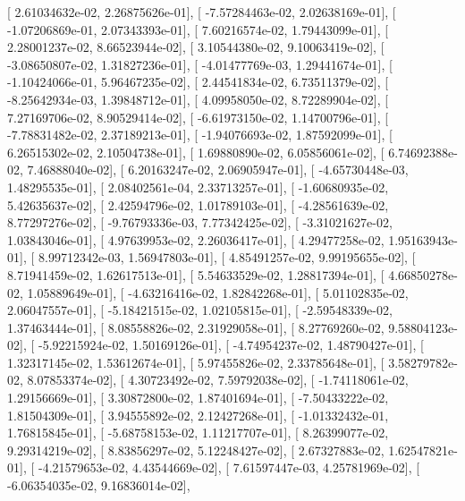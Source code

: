 \documentclass{article}
\begin{document}
       [  2.61034632e-02,   2.26875626e-01],
       [ -7.57284463e-02,   2.02638169e-01],
       [ -1.07206869e-01,   2.07343393e-01],
       [  7.60216574e-02,   1.79443099e-01],
       [  2.28001237e-02,   8.66523944e-02],
       [  3.10544380e-02,   9.10063419e-02],
       [ -3.08650807e-02,   1.31827236e-01],
       [ -4.01477769e-03,   1.29441674e-01],
       [ -1.10424066e-01,   5.96467235e-02],
       [  2.44541834e-02,   6.73511379e-02],
       [ -8.25642934e-03,   1.39848712e-01],
       [  4.09958050e-02,   8.72289904e-02],
       [  7.27169706e-02,   8.90529414e-02],
       [ -6.61973150e-02,   1.14700796e-01],
       [ -7.78831482e-02,   2.37189213e-01],
       [ -1.94076693e-02,   1.87592099e-01],
       [  6.26515302e-02,   2.10504738e-01],
       [  1.69880890e-02,   6.05856061e-02],
       [  6.74692388e-02,   7.46888040e-02],
       [  6.20163247e-02,   2.06905947e-01],
       [ -4.65730448e-03,   1.48295535e-01],
       [  2.08402561e-04,   2.33713257e-01],
       [ -1.60680935e-02,   5.42635637e-02],
       [  2.42594796e-02,   1.01789103e-01],
       [ -4.28561639e-02,   8.77297276e-02],
       [ -9.76793336e-03,   7.77342425e-02],
       [ -3.31021627e-02,   1.03843046e-01],
       [  4.97639953e-02,   2.26036417e-01],
       [  4.29477258e-02,   1.95163943e-01],
       [  8.99712342e-03,   1.56947803e-01],
       [  4.85491257e-02,   9.99195655e-02],
       [  8.71941459e-02,   1.62617513e-01],
       [  5.54633529e-02,   1.28817394e-01],
       [  4.66850278e-02,   1.05889649e-01],
       [ -4.63216416e-02,   1.82842268e-01],
       [  5.01102835e-02,   2.06047557e-01],
       [ -5.18421515e-02,   1.02105815e-01],
       [ -2.59548339e-02,   1.37463444e-01],
       [  8.08558826e-02,   2.31929058e-01],
       [  8.27769260e-02,   9.58804123e-02],
       [ -5.92215924e-02,   1.50169126e-01],
       [ -4.74954237e-02,   1.48790427e-01],
       [  1.32317145e-02,   1.53612674e-01],
       [  5.97455826e-02,   2.33785648e-01],
       [  3.58279782e-02,   8.07853374e-02],
       [  4.30723492e-02,   7.59792038e-02],
       [ -1.74118061e-02,   1.29156669e-01],
       [  3.30872800e-02,   1.87401694e-01],
       [ -7.50433222e-02,   1.81504309e-01],
       [  3.94555892e-02,   2.12427268e-01],
       [ -1.01332432e-01,   1.76815845e-01],
       [ -5.68758153e-02,   1.11217707e-01],
       [  8.26399077e-02,   9.29314219e-02],
       [  8.83856297e-02,   5.12248427e-02],
       [  2.67327883e-02,   1.62547821e-01],
       [ -4.21579653e-02,   4.43544669e-02],
       [  7.61597447e-03,   4.25781969e-02],
       [ -6.06354035e-02,   9.16836014e-02],
\end{document}
